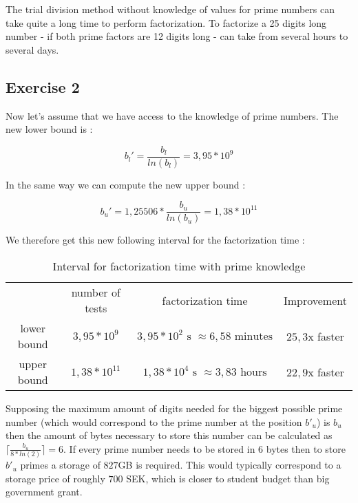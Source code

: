 \documentclass{article}
\begin{document}
The trial division method without knowledge of values for prime numbers can take quite a long time to perform factorization. To factorize a 25 digits long number - if both prime factors are 12 digits long - can take from several hours to several days.

\subsection{Exercise 2}

Now let's assume that we have access to the knowledge of prime numbers. The new lower bound is :

$$b_l'=\frac{b_l}{ln(b_l)}=3,95*10^9$$

In the same way we can compute the new upper bound :

$$b_u'=1,25506*\frac{b_u}{ln(b_u)}=1,38*10^{11}$$

We therefore get this new following interval for the factorization time :

\begin{table}[H]
    \centering
    \begin{tabular}{c|c|c|c}
         & number of tests & factorization time & Improvement \\
        lower bound & $3,95*10^9$ & $3,95*10^{2} \text{ s } \approx 6,58 \text{ minutes}$ & $25,3$x faster \\
        upper bound & $1,38*10^{11}$ & $1,38*10^{4} \text{ s } \approx 3,83 \text{ hours}$ & $22,9$x faster
    \end{tabular}
    \caption{Interval for factorization time with prime knowledge}
\end{table}

Supposing the maximum amount of digits needed for the biggest possible prime number (which would correspond to the prime number at the position $b'_u$) is $b_u$ then the amount of bytes necessary to store this number can be calculated as $\lceil\frac{b_u}{8*ln(2)}\rceil=6$. If every prime number needs to be stored in 6 bytes then to store $b'_u$ primes a storage of $827$GB is required. This would typically correspond to a storage price of roughly $700$ SEK, which is closer to student budget than big government grant.

\end{document}
